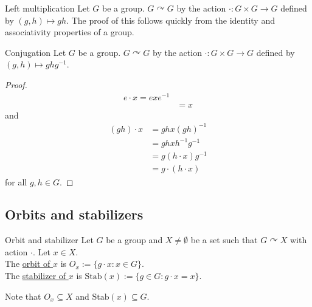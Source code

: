 \documentclass[12pt]{article}
\newcommand{\inv}{^{-1}}
\newcommand{\Stab}{\text{Stab}}
\begin{document}
	\begin{myex}{Left multiplication}{}
		Let $G$ be a group. $G\curvearrowright G$ by the action $\cdot:G\times G\to G$ defined by $(g, h)\mapsto gh$. The proof of this follows quickly from the identity and associativity properties of a group.
	\end{myex}
	
	\begin{myex}{Conjugation}{}
		Let $G$ be a group. $G\curvearrowright G$ by the action $\cdot:G\times G\to G$ defined by $(g, h)\mapsto ghg\inv$.
		\begin{proof}
			\begin{align*}
				e\cdot x=exe\inv\\
				&=x
			\end{align*}
			and
			\begin{align*}
				(gh)\cdot x&=ghx(gh)\inv\\
				&=ghxh\inv g\inv\\
				&=g(h\cdot x)g\inv\\
				&=g\cdot(h\cdot x)
			\end{align*}
			for all $g, h\in G$.
		\end{proof}
	\end{myex}
	
	\subsection{Orbits and stabilizers}
	
	\begin{mydef}{Orbit and stabilizer}{}
		Let $G$ be a group and $X\neq\emptyset$ be a set such that $G\curvearrowright X$ with action $\cdot$. Let $x\in X$.\\
		
		The \underline{orbit of $x$} is $O_x:=\{g\cdot x:x\in G\}$.\\
		
		The \underline{stabilizer of $x$} is $\Stab(x):=\{g\in G:g\cdot x=x\}$.\\
	\end{mydef}
	
	\begin{myrem}{}{}
		Note that $O_x\subseteq X$ and $\Stab(x)\subseteq G$.
	\end{myrem}
	
\end{document}
